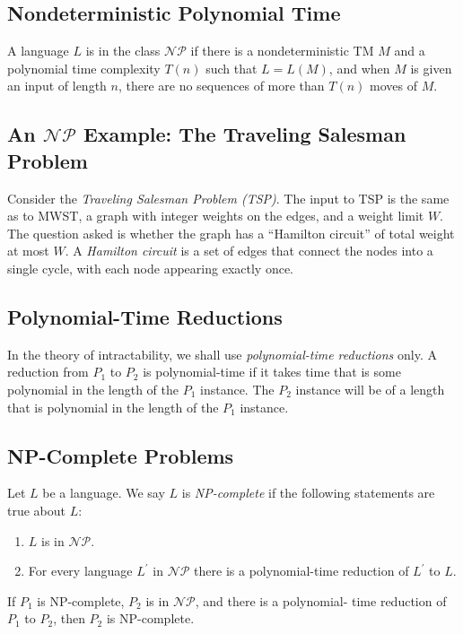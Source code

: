 \documentclass[]{article}
\begin{document}
\subsection*{Nondeterministic Polynomial Time}
A language $L$ is in the class $\mathcal{NP}$ if there is a nondeterministic TM
$M$ and a polynomial time complexity $T(n)$ such that $L = L(M)$, and when $M$
is given an input of length $n$, there are no sequences of more than $T(n)$
moves of $M$.

\subsection*{An $\mathcal{NP}$ Example: The Traveling Salesman Problem}
Consider the \emph{Traveling Salesman Problem (TSP)}. The input to TSP is the
same as to MWST, a graph with integer weights on the edges, and a weight limit
$W$. The question asked is whether the graph has a ``Hamilton circuit'' of total
weight at most $W$. A \emph{Hamilton circuit} is a set of edges that connect the
nodes into a single cycle, with each node appearing exactly once.

\subsection*{Polynomial-Time Reductions}
In the theory of intractability, we shall use \emph{polynomial-time reductions}
only. A reduction from $P_1$ to $P_2$ is polynomial-time if it takes time that
is some polynomial in the length of the $P_1$ instance. The $P_2$ instance will
be of a length that is polynomial in the length of the $P_1$ instance.

\subsection*{NP-Complete Problems}
Let $L$ be a language. We say $L$ is \emph{NP-complete} if the following
statements are true about $L$:
\begin{enumerate}
\item $L$ is in $\mathcal{NP}$.
\item For every language $L^\prime$ in $\mathcal{NP}$ there is a polynomial-time
reduction of $L^\prime$ to $L$.
\end{enumerate}

\begin{thm}
If $P_1$ is NP-complete, $P_2$ is in $\mathcal{NP}$, and there is a polynomial-
time reduction of $P_1$ to $P_2$, then $P_2$ is NP-complete.
\end{thm}
\end{document}
